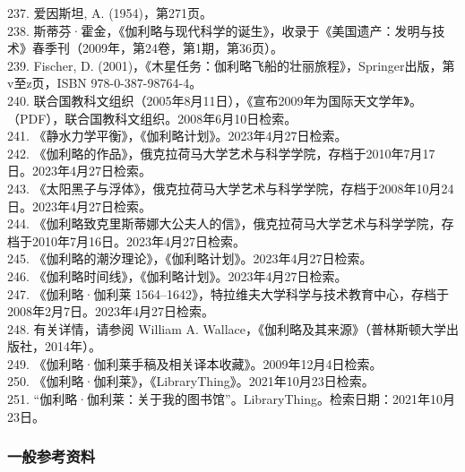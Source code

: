 237. 爱因斯坦, A. (1954)，第271页。\\
238. 斯蒂芬·霍金，《伽利略与现代科学的诞生》，收录于《美国遗产：发明与技术》春季刊（2009年，第24卷，第1期，第36页）。\\
239. Fischer, D. (2001)，《木星任务：伽利略飞船的壮丽旅程》，Springer出版，第v至z页，ISBN 978-0-387-98764-4。\\
240. 联合国教科文组织（2005年8月11日），《宣布2009年为国际天文学年》。（PDF），联合国教科文组织。2008年6月10日检索。\\
241. 《静水力学平衡》，《伽利略计划》。2023年4月27日检索。\\
242. 《伽利略的作品》，俄克拉荷马大学艺术与科学学院，存档于2010年7月17日。2023年4月27日检索。\\
243. 《太阳黑子与浮体》，俄克拉荷马大学艺术与科学学院，存档于2008年10月24日。2023年4月27日检索。\\
244. 《伽利略致克里斯蒂娜大公夫人的信》，俄克拉荷马大学艺术与科学学院，存档于2010年7月16日。2023年4月27日检索。\\
245. 《伽利略的潮汐理论》，《伽利略计划》。2023年4月27日检索。\\
246. 《伽利略时间线》，《伽利略计划》。2023年4月27日检索。\\
247. 《伽利略·伽利莱 1564–1642》，特拉维夫大学科学与技术教育中心，存档于2008年2月7日。2023年4月27日检索。\\
248. 有关详情，请参阅 William A. Wallace，《伽利略及其来源》（普林斯顿大学出版社，2014年）。\\
249. 《伽利略·伽利莱手稿及相关译本收藏》。2009年12月4日检索。\\
250. 《伽利略·伽利莱》，《LibraryThing》。2021年10月23日检索。\\
251. “伽利略·伽利莱：关于我的图书馆”。LibraryThing。检索日期：2021年10月23日。
\subsubsection{一般参考资料}